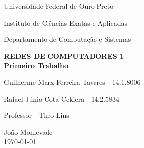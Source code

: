 \documentclass[brazil, a4paper,12pt]{article}
\begin{document}
\begin{titlepage}

  \vfill

  \begin{center}
    \begin{large}
      Universidade Federal de Ouro Preto
    \end{large}
  \end{center}

  \begin{center}
    \begin{large}
      Instituto de Ciências Exatas e Aplicadas
    \end{large}
  \end{center}

  \begin{center}
    \begin{large}
      Departamento de Computação e Sistemas
    \end{large}
  \end{center}

  \vfill

  \begin{center}
    \begin{Large}
      \textbf{REDES DE COMPUTADORES 1\\[0.4cm] 
        Primeiro Trabalho}               
    \end{Large}
  \end{center}


  \vfill

  \begin{center}
    \begin{large}
    	
   	  Guilherme Marx Ferreira Tavares - 14.1.8006
   	  
   	  Rafael Júnio Cota Cekiera - 14.2.5834

       \end{large}
  \end{center}

  \begin{center}
    \begin{large}
      Professor - Theo Lins
    \end{large}
  \end{center}

  \vfill

  \begin{center}
    \begin{large}
      João Monlevade \\
      \today \\
    \end{large}
  \end{center}

\clearpage
\tableofcontents 
\end{titlepage}
\end{document}
